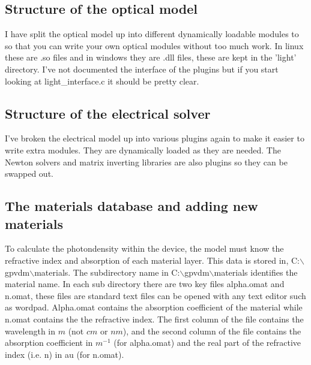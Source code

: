 \documentclass[11pt]{article}
\begin{document}
\subsection{Structure of the optical model}
I have split the optical model up into different dynamically loadable modules to so that you can write your own optical modules without too much work.  In linux these are .so files and in windows they are .dll files, these are kept in the 'light' directory.  I've not documented the interface of the plugins but if you start looking at light\_interface.c it should be pretty clear.

\subsection{Structure of the electrical solver}
I've broken the electrical model up into various plugins again to make it easier to write extra modules.  They are dynamically loaded as they are needed.  The Newton solvers and matrix inverting libraries are also plugins so they can be swapped out.

\subsection{The materials database and adding new materials}
To calculate the photondensity within the device, the model must know the refractive index and absorption of each material layer.  This data is stored in, C:$\backslash$gpvdm$\backslash$materials.  The subdirectory name in C:$\backslash$gpvdm$\backslash$materials identifies the material name.  In each sub directory there are two key files alpha.omat and n.omat, these files are standard text files can be opened with any text editor such as wordpad.    Alpha.omat contains the absorption coefficient of the material while n.omat contains the the refractive index.  The first column of the file contains the wavelength in $m$ (not $cm$ or $nm$), and the second column of the file contains the absorption coefficient in $m^{-1}$ (for alpha.omat) and the real part of the refractive index (i.e. n) in au (for n.omat).
\end{document}
